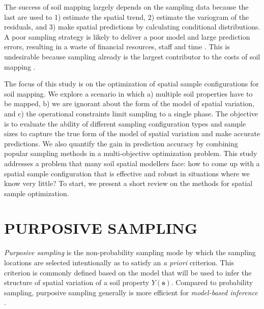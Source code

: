 
The success of soil mapping largely depends on the sampling data because the last are used to 1) estimate the 
spatial trend, 2) estimate the variogram of the residuals, and 3) make spatial predictions by calculating 
conditional distributions. A poor sampling strategy is likely to deliver a poor model and large prediction 
errors, resulting in a waste of financial resources, staff and time \cite{vanGroenigenEtAl1999,  
deGruijterEtAl2006, LanEtAl2010}. This is undesirable because sampling already is the largest contributor to 
the costs of soil mapping \cite{WebsterEtAl1990, vanGroenigenEtAl1999, KempenEtAl2012}.

The focus of this study is on the optimization of spatial sample configurations for soil mapping. We explore a 
scenario in which a) multiple soil properties have to be mapped, b) we are ignorant about the form of the model 
of spatial variation, and c) the operational constraints limit sampling to a single phase. The objective is to 
evaluate the ability of different sampling configuration types and sample sizes to capture the true form of the 
model of spatial variation and make accurate predictions. We also quantify the gain in prediction accuracy by 
combining popular sampling methods in a multi-objective optimization problem. This study addresses a problem 
that many soil spatial modellers face: how to come up with a spatial sample configuration that is effective and 
robust in situations where we know very little? To start, we present a short review on the methods for spatial 
sample optimization.

\section{PURPOSIVE SAMPLING}

\emph{Purposive sampling} is the non-probability sampling mode by which the sampling locations are selected 
intentionally as to satisfy an \textit{a priori} criterion. This criterion is commonly defined based on the 
model that will be used to infer the structure of spatial variation of a soil property $Y(\boldsymbol{s})$. 
Compared to probability sampling, purposive sampling generally is more efficient for \emph{model-based 
inference} \cite{deGruijterEtAl2006}.

